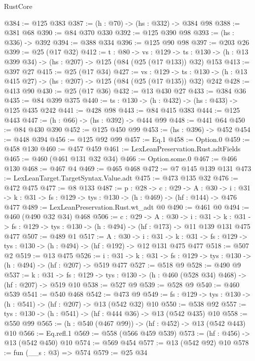 \begin{lexlean}{RustCore}
\begin{coremodule}
@384 := @125 @383
@387 := (h : @70) -> (hs : @332) -> @384 @98
@388 := @381 @68
@390 := @84 @370 @330
@392 := @125 @390 @98
@393 := (hs : @336) -> @392
@394 := @388 @334
@396 := @125 @90 @98
@397 := @203 @26
@399 := @25 (@17 @32)
@412 := {t : @80} ->
  {vs : @129} ->
  {ts : @130} -> (h : @13 @399 @34) -> (hs : @207) -> @125 (@84 (@25 (@17 @133)) @32) @153
@413 := @397 @27
@415 := @25 (@17 @34)
@427 := {vs : @129} ->
  {ts : @130} -> (h : @13 @415 @27) -> (hs : @207) -> @125 (@84 (@25 (@17 @135)) @32) @242
@428 := @413 @90
@430 := @25 (@17 @36)
@432 := @13 @430 @27
@433 := @384 @36
@435 := @84 @399 @375
@440 := {ts : @130} -> (h : @432) -> (hs : @433) -> @125 @435 @242
@441 := @428 @98
@443 := @84 @415 @383
@444 := @125 @443
@447 := (h : @66) -> (hs : @392) -> @444 @99
@448 := @441 @64
@450 := @84 @430 @390
@452 := @125 @450 @99
@453 := (hs : @396) -> @452
@454 := @448 @394
@456 := @125 @92 @99
@457 := Eq.{1}
@458 := Option.{0}
@459 := @458 @130
@460 := @457 @459
@461 := LexLeanPreservation.Rust.adtFields
@465 := @460 (@461 @131 @32 @34)
@466 := Option.some.{0}
@467 := @466 @130
@468 := @467 @4
@469 := @465 @468
@472 := @7 @145 @139 @131
@473 := LexLeanTarget.TargetSyntax.Value.adt
@475 := @473 @135 @32
@476 := @472 @475
@477 := @8 @133
@487 := {p : @28} ->
  {c : @29} ->
  {A : @30} ->
  {i : @31} -> {k : @31} -> {fs : @129} -> {tys : @130} -> (h : @469) -> (hf : @144) -> @476 @477
@489 := LexLeanPreservation.Rust.wt_adt @0
@490 := @461 @0
@494 := @460 (@490 @32 @34) @468
@506 := {c : @29} ->
  {A : @30} ->
  {i : @31} ->
  {k : @31} -> {fs : @129} -> {tys : @130} -> (h : @494) -> (hf : @173) -> @11 @139 @131 @475 @477
@507 := @489 @1
@517 := {A : @30} ->
  {i : @31} ->
  {k : @31} -> {fs : @129} -> {tys : @130} -> (h : @494) -> (hf : @192) -> @12 @131 @475 @477
@518 := @507 @2
@519 := @13 @475
@526 := {i : @31} ->
  {k : @31} -> {fs : @129} -> {tys : @130} -> (h : @494) -> (hf : @207) -> @519 @477
@527 := @518 @9
@528 := @490 @9
@537 := {k : @31} ->
  {fs : @129} -> {tys : @130} -> (h : @460 (@528 @34) @468) -> (hf : @207) -> @519 @10
@538 := @527 @9
@539 := @528 @9
@540 := @460 @539
@541 := @540 @468
@542 := @473 @9
@549 := {fs : @129} -> {tys : @130} -> (h : @541) -> (hf : @207) -> @13 (@542 @32) @10
@550 := @538 @92
@557 := {tys : @130} -> (h : @541) -> (hf : @444 @36) -> @13 (@542 @435) @10
@558 := @550 @99
@565 := (h : @540 (@467 @99)) -> (hf : @452) -> @13 (@542 @443) @10
@566 := Eq.refl.{1}
@569 := @558 (@566 @459 @539)
@573 := (hf : @456) -> @13 (@542 @450) @10
@574 := @569 @454
@577 := @13 (@542 @92) @10
@578 := fun (__s : @3) => @574
@579 := @25 @34

\end{coremodule}
\end{lexlean}
